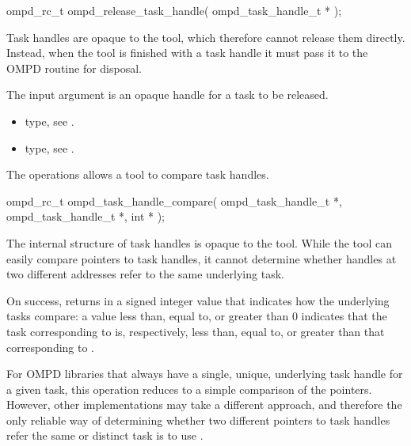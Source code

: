 \begin{cspecific}
\begin{ompSyntax}
ompd_rc_t ompd_release_task_handle(
  ompd_task_handle_t *
);
\end{ompSyntax}
\end{cspecific}


\descr
Task handles are opaque to the tool, which therefore cannot release
them directly. Instead, when the tool is finished with a task handle it must
pass it to the OMPD  routine
for disposal.

\argdesc
The input argument  is an opaque handle for a task
to be released.

\crossreferences
\begin{itemize}
  \item {} type, see .
	\item {} type, see .
\end{itemize}


\label{subsubsubsec:ompd_task_handle_compare}
\summary
The  operations allows a tool to compare task
handles.

\format

\begin{cspecific}
\begin{ompSyntax}
ompd_rc_t ompd_task_handle_compare(
  ompd_task_handle_t *,
  ompd_task_handle_t *,
  int *
);
\end{ompSyntax}
\end{cspecific}


\descr
The internal structure of task handles is opaque to the tool. While the tool can easily compare
pointers to task handles, it cannot determine whether handles at two different addresses refer
to the same underlying task.

On success,  returns in  a signed integer
value that indicates how the underlying tasks compare: a value less than, equal to, or greater than
0 indicates that the task corresponding to  is, respectively, less than, equal
to, or greater than that corresponding to .

For OMPD libraries that always have a single, unique, underlying task handle for a given
task, this operation reduces to a simple comparison of the pointers. However, other
implementations may take a different approach, and therefore the only reliable way of determining
whether two different pointers to task handles refer the same or distinct task is to use
.

